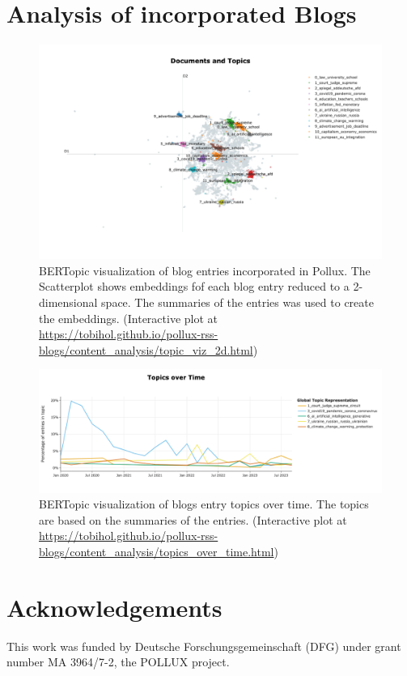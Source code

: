\documentclass{article}
\begin{document}
\section{Analysis of incorporated Blogs}


\begin{figure}[htb]
	\includegraphics[width=1.0\textwidth]{figures/topic_viz_2d.png}
	\caption{BERTopic visualization of blog entries incorporated in Pollux. The Scatterplot shows embeddings fof each blog entry reduced to a 2-dimensional space. The summaries of the entries was used to create the embeddings. (Interactive plot at \url{https://tobihol.github.io/pollux-rss-blogs/content_analysis/topic_viz_2d.html})}
	\label{fig:topic_viz_2d}
\end{figure}

\begin{figure}[htb]
    \includegraphics[width=1.0\textwidth]{figures/topics_over_time.png}
    \caption{BERTopic visualization of blogs entry topics over time. The topics are based on the summaries of the entries. (Interactive plot at \url{https://tobihol.github.io/pollux-rss-blogs/content_analysis/topics_over_time.html})}
    \label{fig:topics_over_time.png}
\end{figure}

\section*{Acknowledgements}
This work was funded by Deutsche Forschungsgemeinschaft (DFG) under grant number MA 3964/7-2, the POLLUX project.




\end{document}
